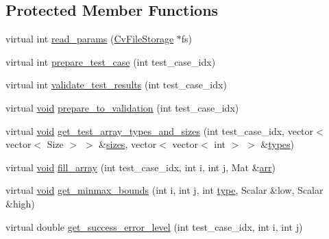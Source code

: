 \subsection*{Protected Member Functions}
\begin{DoxyCompactItemize}
\item 
virtual int \hyperlink{classcvtest_1_1ArrayTest_a844ed0c2aac19d299d0841777023d399}{read\-\_\-params} (\hyperlink{core_2types__c_8h_a84556d1bb6f1b8b02c04c60246747a7e}{Cv\-File\-Storage} $\ast$fs)
\item 
virtual int \hyperlink{classcvtest_1_1ArrayTest_a9c776e6fa32960566d5cea93577bcc98}{prepare\-\_\-test\-\_\-case} (int test\-\_\-case\-\_\-idx)
\item 
virtual int \hyperlink{classcvtest_1_1ArrayTest_ad8a2e0184f77ca42ed3b3aa7229c217e}{validate\-\_\-test\-\_\-results} (int test\-\_\-case\-\_\-idx)
\item 
virtual \hyperlink{legacy_8hpp_a8bb47f092d473522721002c86c13b94e}{void} \hyperlink{classcvtest_1_1ArrayTest_a5316f19edf73f5188277f6a17241f866}{prepare\-\_\-to\-\_\-validation} (int test\-\_\-case\-\_\-idx)
\item 
virtual \hyperlink{legacy_8hpp_a8bb47f092d473522721002c86c13b94e}{void} \hyperlink{classcvtest_1_1ArrayTest_af554f5765f5824f1592192710da319f5}{get\-\_\-test\-\_\-array\-\_\-types\-\_\-and\-\_\-sizes} (int test\-\_\-case\-\_\-idx, vector$<$ vector$<$ Size $>$ $>$ \&\hyperlink{imgproc__c_8h_afcc291f06aa904173ea1ada4741707f6}{sizes}, vector$<$ vector$<$ int $>$ $>$ \&\hyperlink{namespacecvtest_afa1b01409165231a61684009dad82ee4}{types})
\item 
virtual \hyperlink{legacy_8hpp_a8bb47f092d473522721002c86c13b94e}{void} \hyperlink{classcvtest_1_1ArrayTest_ab21b48f875aec91309b66d7c02960d97}{fill\-\_\-array} (int test\-\_\-case\-\_\-idx, int i, int j, Mat \&\hyperlink{core__c_8h_ab8e13ef59ba6f71bb02934957ba61c65}{arr})
\item 
virtual \hyperlink{legacy_8hpp_a8bb47f092d473522721002c86c13b94e}{void} \hyperlink{classcvtest_1_1ArrayTest_aa191c77d3e55e7529a9c5d928e33859e}{get\-\_\-minmax\-\_\-bounds} (int i, int j, int \hyperlink{imgproc__c_8h_a84612d8738bf935200cf32a103d8efe1}{type}, Scalar \&low, Scalar \&high)
\item 
virtual double \hyperlink{classcvtest_1_1ArrayTest_a172b4d6766adcd3492ffc50bb10a9eda}{get\-\_\-success\-\_\-error\-\_\-level} (int test\-\_\-case\-\_\-idx, int i, int j)
\end{DoxyCompactItemize}
